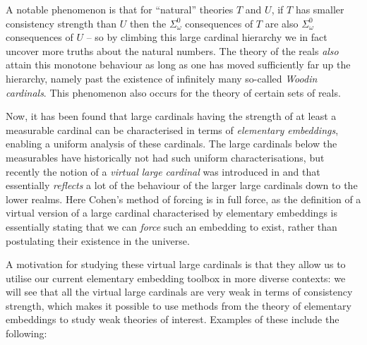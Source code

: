 \documentclass[../main]{subfiles}
\begin{document}
\begin{onehalfspacing}
\quad A notable phenomenon is that for ``natural'' theories $T$ and $U$, if $T$ has smaller consistency strength than $U$ then the $\Sigma^0_\omega$ consequences of $T$ are also $\Sigma^0_\omega$ consequences of $U$ -- so by climbing this large cardinal hierarchy we in fact uncover more truths about the natural numbers. The theory of the reals \textit{also} attain this monotone behaviour as long as one has moved sufficiently far up the hierarchy, namely past the existence of infinitely many so-called \textit{Woodin cardinals}. This phenomenon also occurs for the theory of certain sets of reals.

\quad Now, it has been found that large cardinals having the strength of at least a measurable cardinal can be characterised in terms of \textit{elementary embeddings}, enabling a uniform analysis of these cardinals. The large cardinals below the measurables have historically not had such uniform characterisations, but recently the notion of a \textit{virtual large cardinal} was introduced in \cite{Schindler} and \cite{GitmanSchindler} that essentially \textit{reflects} a lot of the behaviour of the larger large cardinals down to the lower realms. Here Cohen's method of forcing is in full force, as the definition of a virtual version of a large cardinal characterised by elementary embeddings is essentially stating that we can \textit{force} such an embedding to exist, rather than postulating their existence in the universe.


\quad A motivation for studying these virtual large cardinals is that they allow us to utilise our current elementary embedding toolbox in more diverse contexts: we will see that all the virtual large cardinals are very weak in terms of consistency strength, which makes it possible to use methods from the theory of elementary embeddings to study weak theories of interest. Examples of these include the following:



\end{onehalfspacing}
\end{document}
